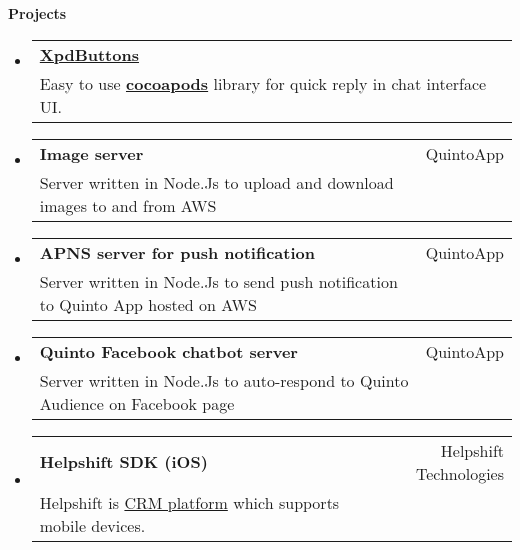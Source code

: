 \documentclass[letterpaper,11pt]{article}
\makeatletter
\newcommand{\resheading}[1]{{\large \colorbox{mygrey}{\begin{minipage}{\textwidth}{\textbf{#1 \vphantom{p\^{E}}}}\end{minipage}}}}
\newcommand{\ressubheading}[3]{
	\begin{tabular*}{6.5in}{l@{\extracolsep{\fill}}r}
			\textbf{#1} & #2\\
			{#3} \\
	\end{tabular*}\vspace{-6pt}
}
\makeatother
\begin{document}
\resheading{Projects}
	\begin{itemize}
		\item 
			\ressubheading{\href{https://cocoapods.org/pods/XpdButtons}{XpdButtons}}{}{Easy to use \href{https://cocoapods.org/pods/XpdButtons}{\textbf{cocoapods}} library for quick reply in chat interface UI.}
		\item 
			\ressubheading{Image server}{QuintoApp}{Server written in Node.Js to upload and download images to and from AWS}
		\item
			\ressubheading{APNS server for push notification}{QuintoApp}{Server written in Node.Js to send push notification to Quinto App hosted on AWS}
		\item
			\ressubheading{Quinto Facebook chatbot server}{QuintoApp}{Server written in Node.Js to auto-respond to Quinto Audience on Facebook page}	
		\item
			\ressubheading{Helpshift SDK (iOS)}{Helpshift Technologies}{Helpshift is \href{https://en.wikipedia.org/wiki/Customer_relationship_management}{CRM platform} which supports mobile devices.}
 


\end{itemize}
\end{document}
